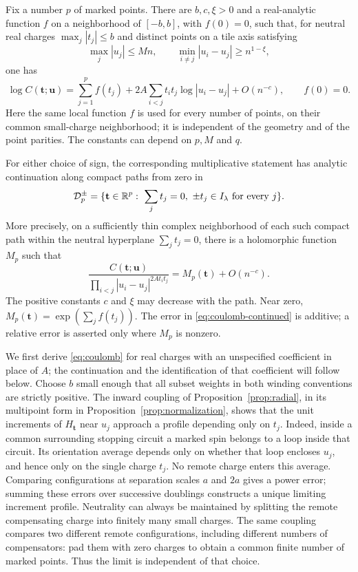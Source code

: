 \begin{proposition}\label{prop:coulomb}
Fix a number $p$ of marked points.  There are $b,c,\xi>0$ and a
real-analytic function $f$ on a neighborhood of $[-b,b]$, with
$f(0)=0$, such that,
for neutral real charges $\max_j|t_j|\le b$ and distinct points on a
tile axis satisfying
\[
 \max_j|u_j|\le Mn,\qquad
 \min_{i\ne j}|u_i-u_j|\ge n^{1-\xi},
\]
one has
\begin{equation}\label{eq:coulomb}
 \log C(\mathbf t;\mathbf u)
 =\sum_{j=1}^p f(t_j)
   +2A\sum_{i<j}t_it_j\log|u_i-u_j|+O(n^{-c}),
 \qquad f(0)=0.
\end{equation}
Here the same local function $f$ is used for every number of points,
on their common small-charge neighborhood; it is independent of the
geometry and of the point parities.
The constants can depend on $p,M$ and $q$.

For either choice of sign, the corresponding multiplicative statement
has analytic continuation along compact paths from zero in
\[
 \mathcal D_p^\pm
 =\{\mathbf t\in\mathbb R^p:\ \sum_jt_j=0,
                         \ \pm t_j\in I_\lambda\text{ for every }j\}.
\]
More precisely, on a sufficiently thin complex neighborhood of each
such compact path within the neutral hyperplane $\sum_jt_j=0$,
there is a holomorphic function $M_p$ such that
\begin{equation}\label{eq:coulomb-continued}
 \frac{C(\mathbf t;\mathbf u)}
 {\displaystyle\prod_{i<j}|u_i-u_j|^{2At_it_j}}
 =M_p(\mathbf t)+O(n^{-c}).
\end{equation}
The positive constants $c$ and $\xi$ may decrease with the path.
Near zero, $M_p(\mathbf t)=\exp(\sum_jf(t_j))$.
The error in \eqref{eq:coulomb-continued} is additive; a relative
error is asserted only where $M_p$ is nonzero.
\end{proposition}

We first derive \eqref{eq:coulomb} for real charges with an unspecified
coefficient in place of $A$; the continuation and the identification of
that coefficient will follow below.  Choose $b$ small enough that
all subset weights in both winding conventions are strictly positive.
The inward coupling of Proposition~\ref{prop:radial}, in its multipoint
form in Proposition~\ref{prop:normalization}, shows that the
unit increments of $H_{\mathbf t}$ near $u_j$ approach a profile
depending only on $t_j$.  Indeed, inside a common surrounding stopping
circuit a marked spin belongs to a loop inside that circuit.  Its
orientation average depends only on whether that loop encloses $u_j$,
and hence only on the single charge $t_j$.  No remote charge enters
this average.  Comparing configurations at separation scales $a$ and
$2a$ gives a power error; summing these errors over successive doublings
constructs a unique limiting increment profile.  Neutrality can always
be maintained by splitting the remote compensating charge into finitely
many small charges.  The same coupling compares two different remote
configurations, including different numbers of compensators: pad them
with zero charges to obtain a common finite number of marked points.
Thus the limit is independent of that choice.

